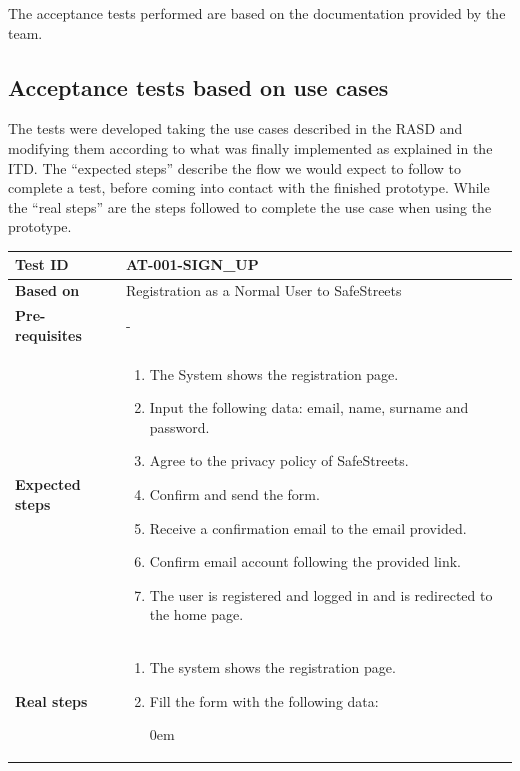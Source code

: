The acceptance tests performed are based on the documentation provided by the team. \\

\subsection{Acceptance tests based on use cases}
The tests were developed taking the use cases described in the RASD and modifying them according to what was finally implemented as explained in the ITD. 
The “expected steps” describe the flow we would expect to follow to complete a test, before coming into contact with the finished prototype. While the “real steps” are the steps followed to complete the use case when using the prototype. \\

\begin{table}[H]
    \centering
    \begin{tabular}{p{3cm}p{10cm}}
    \textbf{Test ID} & AT-001-SIGN\_UP \\ \hline
    \textbf{Based on} & Registration as a Normal User to SafeStreets \\ \hline
    \textbf{Pre-requisites} & - \\ \hline
    \textbf{Expected steps} & 
        \begin{enumerate} \itemsep0em
            \item The System shows the registration page.
            \item Input the following data: email, name, surname and password.
            \item Agree to the privacy policy of SafeStreets.
            \item Confirm and send the form.
            \item Receive a confirmation email to the email provided.
            \item Confirm email account following the provided link.
            \item The user is registered and logged in and is redirected to the home page.
        \end{enumerate} \\ \hline
    \textbf{Real steps} & 
        \begin{enumerate} \itemsep0em
            \item The system shows the registration page.
            \item Fill the form with the following data:
                \begin{itemize}[label={}] \itemsep0em

\end{itemize}
\end{enumerate}
\end{tabular}
\end{table}
